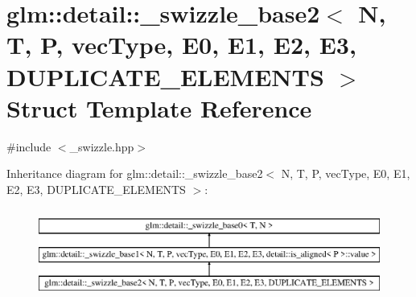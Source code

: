 \hypertarget{structglm_1_1detail_1_1__swizzle__base2}{}\section{glm\+::detail\+::\+\_\+swizzle\+\_\+base2$<$ N, T, P, vec\+Type, E0, E1, E2, E3, D\+U\+P\+L\+I\+C\+A\+T\+E\+\_\+\+E\+L\+E\+M\+E\+N\+TS $>$ Struct Template Reference}
\label{structglm_1_1detail_1_1__swizzle__base2}


{\ttfamily \#include $<$\+\_\+swizzle.\+hpp$>$}

Inheritance diagram for glm\+::detail\+::\+\_\+swizzle\+\_\+base2$<$ N, T, P, vec\+Type, E0, E1, E2, E3, D\+U\+P\+L\+I\+C\+A\+T\+E\+\_\+\+E\+L\+E\+M\+E\+N\+TS $>$\+:\begin{figure}[H]
\begin{center}
\leavevmode
\includegraphics[height=3.000000cm]{structglm_1_1detail_1_1__swizzle__base2}
\end{center}
\end{figure}

